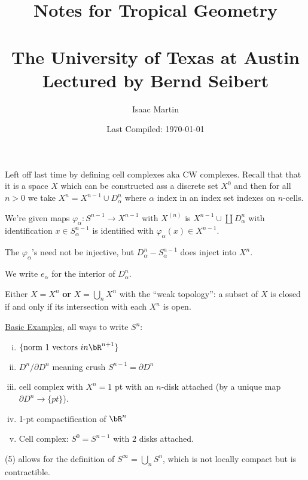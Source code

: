 
\usepackage{indentfirst}

\title{Notes for Tropical Geometry\\ \vspace{0.5em}{\Large Fall 2022}\vspace{0.5em}\\ The University of Texas at Austin \\ Lectured by Bernd Seibert}
\date{Last Compiled: \today}
\author{Isaac Martin}


\pagestyle{empty}
\maketitle
\newpage
\tableofcontents
\newpage
{}

Left off last time by defining cell complexes aka CW complexes. Recall that that it is a space $X$ which can be constructed ass a discrete set $X^0$ and then for all $n > 0$ we take $X^n = X^{n-1} \cup D^n_\alpha$ where $\alpha$ index in an index set indexes on $n$-cells.

We're given maps $\varphi_\alpha:S^{n-1} \to X^{n-1}$ with $X^{(n)}$ is $X^{n-1} \cup \coprod D_\alpha ^n$ with identification $x \in S^{n-1}_\alpha$ is identified with $\varphi_\alpha(x) \in X^{n-1}$.

The $\varphi_\alpha$'s need not be injective, but $D_\alpha^n - S^{n-1}_\alpha$ does inject into $X^n$.

We write $e_\alpha$ for the interior of $D^n_\alpha$.

Either $X = X^n$ \textbf{or} $X = \bigcup_n X^n$ with the ``weak topology'': a subset of $X$ is closed if and only if its intersection with each $X^n$ is open.

\begin{example}\label{example:different-sphere-constructions}  
  \underline{Basic Examples}, all ways to write $S^n$:
  \begin{enumerate}[(i)]
    \item $\{\text{norm 1 vectors } in \bR^{n+1}\}$
    \item $D^n / \partial D^n$ meaning crush $S^{n-1} = \partial D^n$
    \item cell complex with $X^n = 1$ pt with an $n$-disk attached (by a unique map $\partial D^n\to \{pt\}$).
    \item 1-pt compactification of $\bR^{n}$
    \item Cell complex: $S^0 = S^{n-1}$ with $2$ disks attached.
  \end{enumerate}
  (5) allows for the definition of $S^\infty = \bigcup_n S^n$, which is not locally compact but is contractible.
\end{example}

